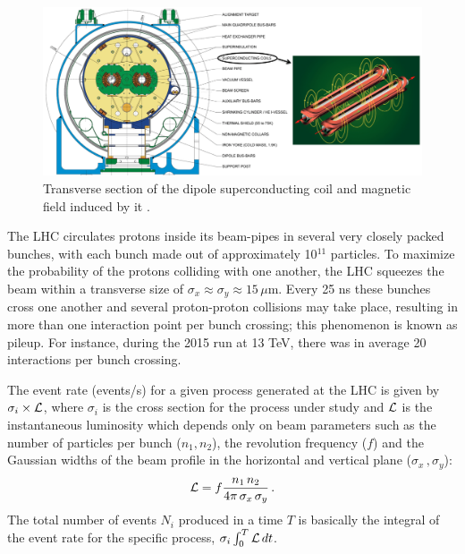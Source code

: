 \begin{figure}[h!!!!]
\hspace{-0.5cm}
\includegraphics[scale=0.35]{figures/experiment/lhcdipole.png}
\caption[Dipole superconducting magnet]{Transverse section of the dipole superconducting coil and magnetic field induced by it \cite{Bruning:782076}.}
\label{dipole}
\end{figure}

The LHC circulates protons inside its beam-pipes in several very closely packed bunches, with each bunch made out of approximately 10$^{11}$ particles. To maximize the probability of the protons colliding with one another, the LHC squeezes the beam within a transverse size of $\sigma_x\approx\sigma_y\approx 15\,\mu$m.
\noindent Every 25 ns these bunches cross one another and several proton-proton collisions may take place, resulting in more than one interaction point per bunch crossing; this phenomenon is known as pileup. For instance, during the 2015 run at 13 TeV, there was in average 20 interactions per bunch crossing. 

The event rate (events/s) for a given process generated at the LHC is given by $\sigma_i \times {\cal L}$, where $\sigma_i$ is the cross section for the process under study and ${\cal L}$ is the instantaneous luminosity which depends only on beam parameters such as the number of particles per bunch ($n_1, n_2$), the revolution frequency ($f$) and the Gaussian widths of the beam profile in the horizontal and vertical plane ($\sigma_x\,,\sigma_y$):
\begin{equation}
{\cal L}  = f \frac{n_1 \, n_2}{4\pi \, \sigma_x \, \sigma_y}\,.
\end{equation}
The total number of events $N_i$ produced in a time $T$ is basically the integral of the event rate for the specific process, 
$\sigma_i \int^T_0 {\cal L} \, dt$.

